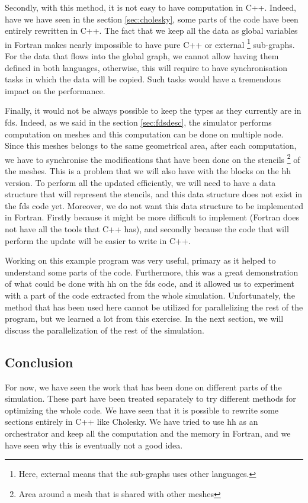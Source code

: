 Secondly, with this method, it is not easy to have computation in C++. Indeed,
have we have seen in the section \ref{sec:cholesky}, some parts of the code have
been entirely rewritten in C++. The fact that we keep all the data as global
variables in Fortran makes nearly impossible to have pure C++ or external
\footnote{Here, external means that the sub-graphs uses other languages.}
sub-graphs. For the data that flows into the global graph, we cannot allow
having them defined in both languages, otherwise, this will require to have
synchronisation tasks in which the data will be copied. Such tasks would have a
tremendous impact on the performance.

Finally, it would not be always possible to keep the types as they currently are
in \gls{fds}. Indeed, as we said in the section \ref{sec:fdsdesc}, the simulator
performs computation on meshes and this computation can be done on multiple
node. Since this meshes belongs to the same geometrical area, after each
computation, we have to synchronise the modifications that have been done on the
stencils \footnote{Area around a mesh that is shared with other meshes} of the
meshes. This is a problem that we will also have with the blocks on the \gls{hh}
version. To perform all the updated efficiently, we will need to have a data
structure that will represent the stencils, and this data structure does not
exist in the \gls{fds} code yet. Moreover, we do not want this data structure to
be implemented in Fortran. Firstly because it might be more difficult to
implement (Fortran does not have all the tools that C++ has), and secondly
because the code that will perform the update will be easier to write in C++.

Working on this example program was very useful, primary as it helped to
understand some parts of the code. Furthermore, this was a great demonstration
of what could be done with \gls{hh} on the \gls{fds} code, and it allowed us to
experiment with a part of the code extracted from the whole simulation.
Unfortunately, the method that has been used here cannot be utilized for
parallelizing the rest of the program, but we learned a lot from this exercise.
In the next section, we will discuss the parallelization of the rest of the
simulation.

\subsection{Conclusion}
\label{sec:fdsconcl}

For now, we have seen the work that has been done on different parts of the
simulation. These part have been treated separately to try different methods for
optimizing the whole code. We have seen that it is possible to rewrite some
sections entirely in C++ like Cholesky. We have tried to use \gls{hh} as an
orchestrator and keep all the computation and the memory in Fortran, and we have
seen why this is eventually not a good idea.

